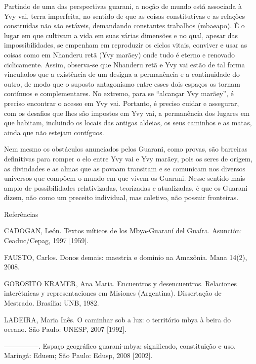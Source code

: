 \documentclass{article}
\begin{document}
Partindo de uma das perspectivas guarani, a no\c{c}\~ao de mundo est\'a
associada \`a Yvy vai, terra imperfeita, no sentido de que as coisas
constitutivas e as rela\c{c}\~oes constru\'idas n\~ao s\~ao est\'aveis,
demandando constantes trabalhos (mbaeapo). \'E o lugar em que cultivam
a vida em suas v\'arias dimens\~oes e no qual, apesar das
impossibilidades, se empenham em reproduzir os ciclos vitais, conviver
e usar as coisas como em Nhanderu ret\~a (Yvy mar\~aey) onde tudo \'e
eterno e renovado ciclicamente. Assim, observa-se que Nhanderu ret\~a e
Yvy vai est\~ao de tal forma vinculados que a exist\^encia de um
designa a perman\^encia e a continuidade do outro, de modo que o
suposto antagonismo entre esses dois espa\c{c}os os tornam cont\'inuos
e complementares. No extremo, para se {\textquotedblleft}alcan\c{c}ar
Yvy mar\~aey{\textquotedblright}, \'e preciso encontrar o acesso em Yvy
vai. Portanto, \'e preciso cuidar e assegurar, com os desafios que lhes
s\~ao impostos em Yvy vai, a perman\^encia dos lugares em que habitam,
incluindo os locais das antigas aldeias, os seus caminhos e as matas,
ainda que n\~ao estejam cont\'iguos. 

Nem mesmo os obst\'aculos anunciados pelos Guarani, como provas, s\~ao
barreiras definitivas para romper o elo entre Yvy vai e Yvy mar\~aey,
pois os seres de origem, as divindades e as almas que as povoam
transitam e se comunicam nos diversos universos que comp\~oem o mundo
em que vivem os Guarani. Nesse sentido mais amplo de possibilidades
relativizadas, teorizadas e atualizadas, \'e que os Guarani dizem,
n\~ao como um preceito individual, mas coletivo, n\~ao possuir
fronteiras.

Refer\^encias

CADOGAN, Le\'on. Textos m\'iticos de los Mbya-Guaran\'i del Gua\'ira.
Asunci\'on: Ceaduc/Cepag, 1997 [1959].

FAUSTO, Carlos. Donos demais: maestria e dom\'inio na Amaz\^onia. Mana
14(2), 2008. 

GOROSITO KRAMER, Ana Maria. Encuentros y desencuentros. Relaciones
inter\'etnicas y representaciones em Misiones (Argentina).
Disserta\c{c}\~ao de Mestrado. Bras\'ilia: UNB, 1982.

LADEIRA, Maria In\^es.  O caminhar sob a luz: o territ\'orio mbya \`a
beira do oceano. S\~ao Paulo: UNESP, 2007 [1992].

{}---{}---{}---{}---{}---. Espa\c{c}o geogr\'afico guarani-mbya:
significado, constitui\c{c}\~ao e uso. Maring\'a: Eduem; S\~ao Paulo:
Edusp, 2008 [2002].
\end{document}
